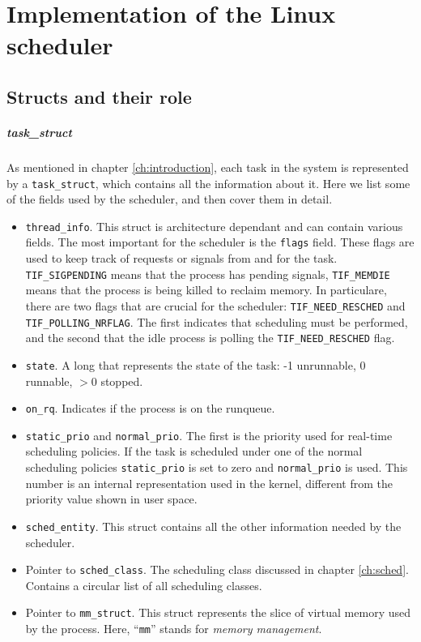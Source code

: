 \chapter{Implementation of the Linux scheduler}
\label{chap:implementation}

\section{Structs and their role}

\paragraph{task\_struct}
As mentioned in chapter \ref{ch:introduction}, each task in the system is represented \newline by a \verb|task_struct|, which contains all the information about it. Here we list some of the fields used by the scheduler, and then cover them in detail.
\begin{itemize}
    \item \verb|thread_info|. This struct is architecture dependant and can contain various fields. The most important for the scheduler is the \verb|flags| field. These flags are used to keep track of requests or signals from and for the task. \verb|TIF_SIGPENDING| means that the process has pending signals, \verb|TIF_MEMDIE| means that the process is being killed to reclaim memory. In particulare, there are two flags that are crucial for the scheduler: \verb|TIF_NEED_RESCHED| and \verb|TIF_POLLING_NRFLAG|. The first indicates that scheduling must be performed, and the second that the idle process is polling the \verb|TIF_NEED_RESCHED| flag.
    \item \verb|state|. A long that represents the state of the task: -1 unrunnable, 0 runnable, $>0$ stopped. 
    \item \verb|on_rq|. Indicates if the process is on the runqueue.
    \item \verb|static_prio| and \verb|normal_prio|. The first is the priority used for real-time scheduling policies. If the task is scheduled under one of the normal scheduling policies \verb|static_prio| is set to zero and \verb|normal_prio| is used. This number is an internal representation used in the kernel, different from the priority value shown in user space.
    \item \verb|sched_entity|. This struct contains all the other information needed by the scheduler.
    \item Pointer to \verb|sched_class|. The scheduling class discussed in chapter \ref{ch:sched}. Contains a circular list of all scheduling classes.
    \item Pointer to \verb|mm_struct|. This struct represents the slice of virtual memory used by the process. Here, ``\verb|mm|'' stands for \textit{memory management}.
\end{itemize}

